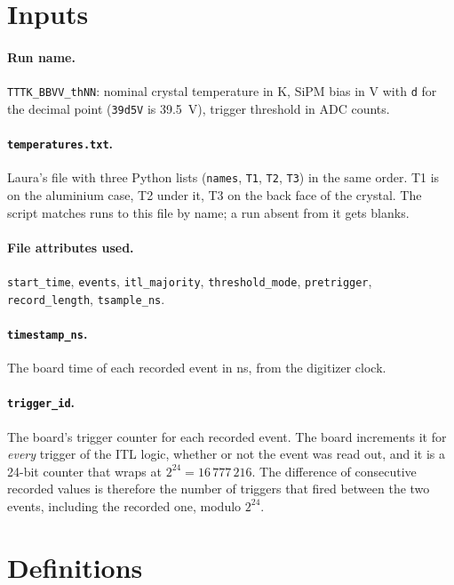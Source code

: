 \documentclass[11pt]{article}
\newcommand{\code}[1]{\texttt{#1}}
\begin{document}
\section{Inputs}

\paragraph{Run name.} \code{TTTK\_BBVV\_thNN}: nominal crystal temperature in
K, SiPM bias in V with \code{d} for the decimal point (\code{39d5V} is
39.5~V), trigger threshold in ADC counts.

\paragraph{\code{temperatures.txt}.} Laura's file with three Python lists
(\code{names}, \code{T1}, \code{T2}, \code{T3}) in the same order. T1 is on
the aluminium case, T2 under it, T3 on the back face of the crystal. The
script matches runs to this file by name; a run absent from it gets blanks.

\paragraph{File attributes used.} \code{start\_time}, \code{events},
\code{itl\_majority}, \code{threshold\_mode}, \code{pretrigger},
\code{record\_length}, \code{tsample\_ns}.

\paragraph{\code{timestamp\_ns}.} The board time of each recorded event in
ns, from the digitizer clock.

\paragraph{\code{trigger\_id}.} The board's trigger counter for each
recorded event. The board increments it for \emph{every} trigger of the
ITL logic, whether or not the event was read out, and it is a 24-bit
counter that wraps at $2^{24} = 16\,777\,216$. The difference of consecutive
recorded values is therefore the number of triggers that fired between the
two events, including the recorded one, modulo $2^{24}$.

\section{Definitions}
\end{document}

